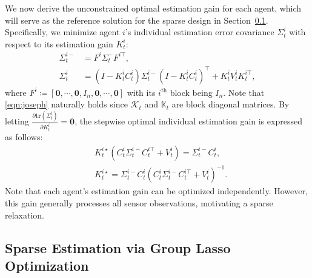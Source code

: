 \documentclass[letterpaper, 10 pt, conference]{ieeeconf}  %
\begin{document}
We now derive the unconstrained optimal estimation gain for each agent, which will serve as the reference solution for the sparse design in Section~\ref{sec:sparse_est_group_lasso}. Specifically, we minimize agent $i$'s individual estimation error covariance $\Sigma_t^i$ with respect to its estimation gain $K_t^i$:
\begin{subequations}
    \begin{align}
        \Sigma_t^{i-}&=F^i\Sigma_t^-F^{i\top},\\
        \Sigma_t^i&=(I-K_t^iC_t^i)\Sigma_t^{i-}(I-K_t^iC_t^i)^\top+K_t^iV_t^iK_t^{i\top},\label{eqn:joseph}
    \end{align}
\end{subequations}
where $F^i\coloneqq[\textbf{0},\cdots,\textbf{0},I_n,\textbf{0},\cdots,\textbf{0}]$
with its $i^\text{th}$ block being $I_n$. Note that \eqref{eqn:joseph} naturally holds since $\mathcal{K}_t$ and $\mathbb{K}_t$ are block diagonal matrices.
By letting $\frac{\partial \textbf{tr}(\Sigma_t^i)}{\partial K_t^i}=\textbf{0}$, the stepwise optimal individual estimation gain is expressed as follows:
\begin{equation}
\begin{aligned}
    &K_t^{i\star}(C_t^i\Sigma_t^{i-}C_t^{i\top}+V_t^i)=\Sigma_t^{i-}C_t^i,\\
    &K_t^{i\star}=\Sigma_t^{i-}C_t^i(C_t^i\Sigma_t^{i-}C_t^{i\top}+V_t^i)^{-1}.
\end{aligned}
    \label{eqn:alternating_kalman}
\end{equation}
Note that each agent's estimation gain can be optimized independently. However, this gain generally processes all sensor observations, motivating a sparse relaxation.


\subsection{Sparse Estimation via Group Lasso Optimization}
\label{sec:sparse_est_group_lasso}
\end{document}
